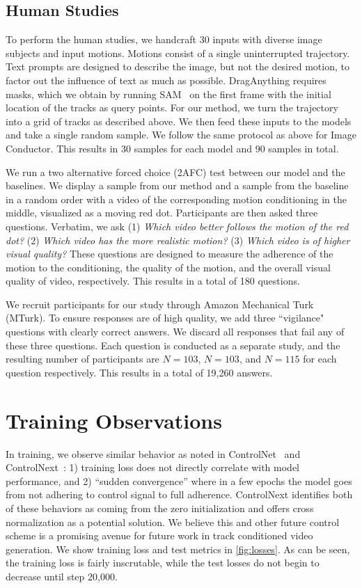 

\subsection{Human Studies}

To perform the human studies, we handcraft 30 inputs with diverse image subjects and input motions. Motions consist of a single uninterrupted trajectory. Text prompts are designed to describe the image, but not the desired motion, to factor out the influence of text as much as possible. DragAnything requires masks, which we obtain by running SAM~\cite{kirillov2023segany} on the first frame with the initial location of the tracks as query points. For our method, we turn the trajectory into a grid of tracks as described above. We then feed these inputs to the models and take a single random sample. We follow the same protocol as above for Image Conductor. This results in 30 samples for each model and 90 samples in total. 

We run a two alternative forced choice (2AFC) test between our model and the baselines. We display a sample from our method and a sample from the baseline in a random order with a video of the corresponding motion conditioning in the middle, visualized as a moving red dot. Participants are then asked three questions. Verbatim, we ask (1) {\it Which video better follows the motion of the red dot?} (2) {\it Which video has the more realistic motion?} (3) {\it Which video is of higher visual quality?} These questions are designed to measure the adherence of the motion to the conditioning, the quality of the motion, and the overall visual quality of video, respectively. This results in a total of 180 questions.

We recruit participants for our study through Amazon Mechanical Turk (MTurk). To ensure responses are of high quality, we add three ``vigilance" questions with clearly correct answers. We discard all responses that fail any of these three questions. Each question is conducted as a separate study, and the resulting number of participants are $N=103$, $N=103$, and $N=115$ for each question respectively. This results in a total of 19,260 answers.


\section{Training Observations}
\label{apdx:training}

In training, we observe similar behavior as noted in ControlNet~\cite{zhang2023adding} and ControlNext~\cite{peng2024controlnext}: 1) training loss does not directly correlate with model performance, and 2) ``sudden convergence'' where in a few epochs the model goes from not adhering to control signal to full adherence. ControlNext identifies both of these behaviors as coming from the zero initialization and offers cross normalization as a potential solution. We believe this and other future control scheme is a promising avenue for future work in track conditioned video generation. We show training loss and test metrics in \cref{fig:losses}. As can be seen, the training loss is fairly inscrutable, while the test losses do not begin to decrease until step 20,000.

